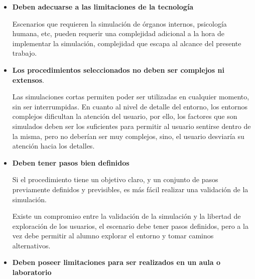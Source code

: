 \begin{itemize}

\item \textbf{Deben adecuarse a las limitaciones de la tecnología} 

    Escenarios que requieren la simulación de órganos internos, psicología
    humana, etc, pueden requerir una complejidad adicional a la hora de
    implementar la simulación, complejidad que escapa al alcance del
    presente trabajo.

%
%    
%

\item \textbf{Los procedimientos seleccionados no deben ser complejos ni
        extensos}. 

    Las simulaciones cortas permiten poder ser utilizadas en cualquier momento,
    sin ser interrumpidas. En cuanto al nivel de detalle del entorno, los
    entornos complejos dificultan la atención del
    usuario\cite{videojuegos:gonzaleztardon}, por ello, los factores que son
    simulados deben ser los suficientes para permitir al usuario sentirse dentro
    de la misma, pero no deberían ser muy complejos, sino, el usuario desviaría su
    atención hacia los detalles.

\item \textbf{Deben tener pasos bien definidos}
    
    Si el procedimiento tiene un objetivo claro, y un conjunto de pasos
    previamente definidos y previsibles, es más fácil realizar una validación de la
    simulación.

    Existe un compromiso entre la validación de la simulación y la libertad de
    exploración de los usuarios, el escenario debe tener pasos
    definidos, pero a la vez debe permitir al alumno explorar el entorno y
    tomar caminos alternativos.

\item \textbf{Deben poseer limitaciones para ser realizados en un aula o
        laboratorio}


\end{itemize}
